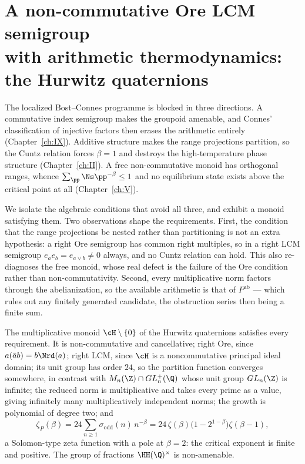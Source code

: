 \chapter[A non-commutative Ore LCM semigroup: the Hurwitz quaternions]{A non-commutative Ore LCM semigroup\\ with arithmetic thermodynamics:\\ the Hurwitz quaternions}\label{ch:X}
\begin{summary}
The localized Bost--Connes programme is blocked in three directions. A commutative index
semigroup makes the groupoid amenable, and Connes' classification of injective factors then
erases the arithmetic entirely (Chapter~\ref{ch:IX}). Additive structure makes the range
projections partition, so the Cuntz relation forces $\beta=1$ and destroys the
high-temperature phase structure (Chapter~\ref{ch:II}). A free non-commutative monoid has orthogonal
ranges, whence $\sum_\pp\Ns\pp^{-\beta}\le1$ and no equilibrium state exists above the critical
point at all (Chapter~\ref{ch:V}).

We isolate the algebraic conditions that avoid all three, and exhibit a monoid satisfying
them. Two observations shape the requirements. First, the condition that the range
projections be nested rather than partitioning is not an extra hypothesis: a right Ore
semigroup has common right multiples, so in a right LCM semigroup $e_ae_b=e_{a\vee b}\ne0$
always, and no Cuntz relation can hold. This also re-diagnoses the free monoid, whose real
defect is the failure of the Ore condition rather than non-commutativity. Second, every
multiplicative norm factors through the abelianization, so the available arithmetic is that
of $P^{\mathrm{ab}}$ --- which rules out any finitely generated candidate, the obstruction
series then being a finite sum.

The multiplicative monoid $\cH\setminus\{0\}$ of the Hurwitz quaternions satisfies every
requirement. It is non-commutative and cancellative; right Ore, since
$a(\bar ab)=b\Nrd(a)$; right LCM, since $\cH$ is a noncommutative principal ideal domain; its
unit group has order $24$, so the partition function converges somewhere, in contrast with
$M_n(\Z)\cap GL_n^+(\Q)$ whose unit group $GL_n(\Z)$ is infinite; the reduced norm is
multiplicative and takes every prime as a value, giving infinitely many multiplicatively
independent norms; the growth is polynomial of degree two; and
\[
\zeta_P(\beta)=24\sum_{n\ge1}\sigma_{\mathrm{odd}}(n)\,n^{-\beta}
=24\,\zeta(\beta)\bigl(1-2^{1-\beta}\bigr)\zeta(\beta-1),
\]
a Solomon-type zeta function with a pole at $\beta=2$: the critical exponent is finite and
positive. The group of fractions $\HH(\Q)^\times$ is non-amenable.


\end{summary}
